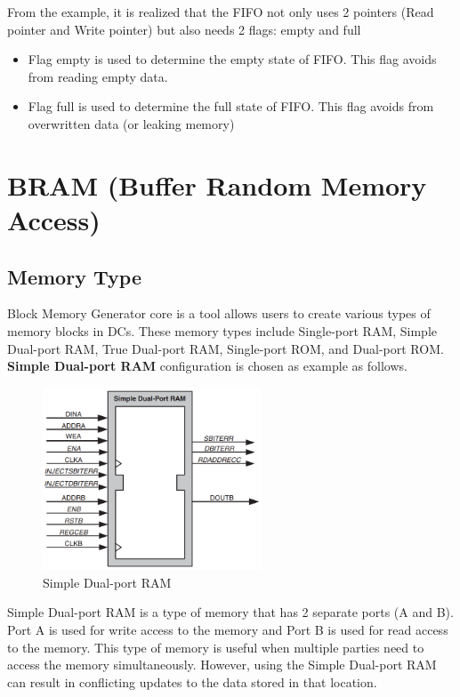 \documentclass[a4paper, 12pt]{report}
\begin{document}
From the example, it is realized that the FIFO not only uses 2 pointers (Read pointer and Write pointer) but also needs 2 flags: empty and full
\begin{itemize}
    \item Flag empty is used to determine the empty state of FIFO. This flag avoids from reading empty data.
    \item Flag full is used to determine the full state of FIFO. This flag avoids from overwritten data (or leaking memory)
\end{itemize}
\section{BRAM (Buffer Random Memory Access)}
\subsection{Memory Type}
Block Memory Generator core is a tool allows users to create various types of memory blocks  in DCs. These memory types include Single-port RAM, Simple Dual-port RAM, True Dual-port RAM, Single-port ROM, and Dual-port ROM. \textbf{Simple Dual-port RAM} configuration is chosen as example as follows.
\begin{figure}[H]
    \centering
    \includegraphics[width = 6.5cm]{picture/BRAM/dual-port.png}
    \caption{Simple Dual-port RAM}
    \medskip
\end{figure}
Simple Dual-port RAM is a type of memory that has 2 separate ports (A and B). Port A is used for write access to the memory and Port B is used for read access to the memory. This type of memory is useful when multiple parties need to access the memory simultaneously. However, using the Simple Dual-port RAM can result in conflicting updates to the data stored in that location.
\end{document}
